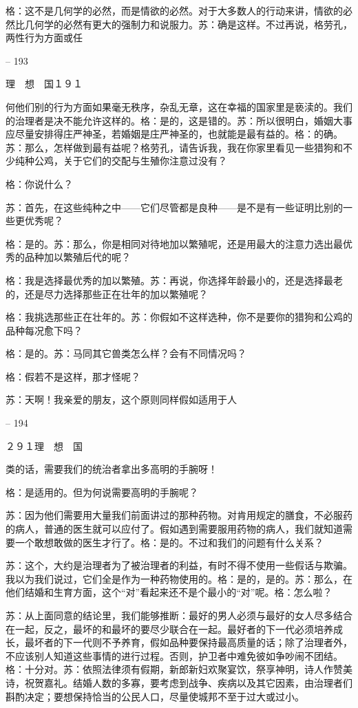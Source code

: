 \documentclass[11pt,oneside]{book}
\begin{document}
\begin{common-format}
    格：这不是几何学的必然，而是情欲的必然。对于大多数人的行动来讲，情欲的必然比几何学的必然有更大的强制力和说服力。苏：确是这样。不过再说，格劳孔，两性行为方面或任

    

-- 193

    理　想　国１９１

    何他们别的行为方面如果毫无秩序，杂乱无章，这在幸福的国家里是亵渎的。我们的治理者是决不能允许这样的。格：是的，这是错的。苏：所以很明白，婚姻大事应尽量安排得庄严神圣，若婚姻是庄严神圣的，也就能是最有益的。格：的确。苏：那么，怎样做到最有益呢？格劳孔，请告诉我，我在你家里看见一些猎狗和不少纯种公鸡，关于它们的交配与生殖你注意过没有？

    格：你说什么？

    苏：首先，在这些纯种之中——它们尽管都是良种——是不是有一些证明比别的一些更优秀呢？

    格：是的。苏：那么，你是相同对待地加以繁殖呢，还是用最大的注意力选出最优秀的品种加以繁殖后代的呢？

    格：我是选择最优秀的加以繁殖。苏：再说，你选择年龄最小的，还是选择最老的，还是尽力选择那些正在壮年的加以繁殖呢？

    格：我挑选那些正在壮年的。苏：你假如不这样选种，你不是要你的猎狗和公鸡的品种每况愈下吗？

    格：是的。苏：马同其它兽类怎么样？会有不同情况吗？

    格：假若不是这样，那才怪呢？

    苏：天啊！我亲爱的朋友，这个原则同样假如适用于人

    

-- 194

    ２９１理　想　国

    类的话，需要我们的统治者拿出多高明的手腕呀！

    格：是适用的。但为何说需要高明的手腕呢？

    苏：因为他们需要用大量我们前面讲过的那种药物。对肯用规定的膳食，不必服药的病人，普通的医生就可以应付了。假如遇到需要服用药物的病人，我们就知道需要一个敢想敢做的医生才行了。格：是的。不过和我们的问题有什么关系？

    苏：这个，大约是治理者为了被治理者的利益，有时不得不使用一些假话与欺骗。我以为我们说过，它们全是作为一种药物使用的。格：是的，是的。苏：那么，在他们结婚和生育方面，这个“对”看起来还不是个最小的“对”呢。格：怎么啦？

    苏：从上面同意的结论里，我们能够推断：最好的男人必须与最好的女人尽多结合在一起，反之，最坏的和最坏的要尽少联合在一起。最好者的下一代必须培养成长，最坏者的下一代则不予养育，假如品种要保持最高质量的话；除了治理者外，不应该别人知道这些事情的进行过程。否则，护卫者中难免彼如争吵闹不团结。格：十分对。苏：依照法律须有假期，新郎新妇欢聚宴饮，祭享神明，诗人作赞美诗，祝贺嘉礼。结婚人数的多寡，要考虑到战争、疾病以及其它因素，由治理者们斟酌决定；要想保持恰当的公民人口，尽量使城邦不至于过大或过小。


\end{common-format}
\end{document}
